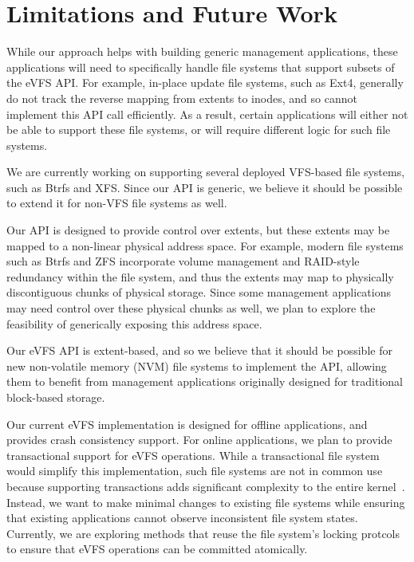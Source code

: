 \vspace{-0.7em}
\section{Limitations and Future Work\label{sec:Future_Work}}
\vspace{-0.4em}

While our approach helps with building generic management applications, these applications will need to specifically handle file systems that support subsets of the eVFS API. For example, in-place update file systems, such as Ext4, generally do not track the reverse mapping from extents to inodes, and so cannot implement this API call efficiently. As a result, certain applications will either not be able to support these file systems, or will require different logic for such file systems.

We are currently working on supporting several deployed VFS-based file systems, such as Btrfs and XFS. Since our API is generic, we believe it should be possible to extend it for non-VFS file systems as well.

Our API is designed to provide control over extents, but these extents may be mapped to a non-linear physical address space. For example, modern file systems such as Btrfs and ZFS incorporate volume management and RAID-style redundancy within the file system, and thus the extents may map to physically discontiguous chunks of physical storage. Since some management applications may need control over these physical chunks as well, we plan to explore the feasibility of generically exposing this address space.

Our eVFS API is extent-based, and so we believe that it should be possible for new non-volatile memory (NVM) file systems to implement the API, allowing them to benefit from management applications originally designed for traditional block-based storage.

Our current eVFS implementation is designed for offline applications, and provides crash consistency support. For online applications, we plan to provide transactional support for eVFS operations. While a transactional file system would simplify this implementation, such file systems are not in common use because supporting transactions adds significant complexity to the entire kernel~\cite{Spillane2009}. Instead, we want to make minimal changes to existing file systems while ensuring that existing applications cannot observe inconsistent file system states. Currently, we are exploring methods that reuse the file system's locking protcols to ensure that eVFS operations can be committed atomically.

